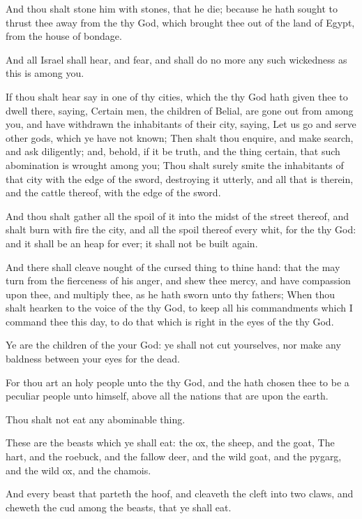 \Verse And thou shalt stone him with stones, that he die; because he hath sought to thrust thee away from the \LORD thy God, which brought thee out of the land of Egypt, from the house of bondage.

\Verse And all Israel shall hear, and fear, and shall do no more any such wickedness as this is among you.

\Verse If thou shalt hear say in one of thy cities, which the \LORD thy God hath given thee to dwell there, saying, \Verse Certain men, the children of Belial, are gone out from among you, and have withdrawn the inhabitants of their city, saying, Let us go and serve other gods, which ye have not known; \Verse Then shalt thou enquire, and make search, and ask diligently; and, behold, if it be truth, and the thing certain, that such abomination is wrought among you; \Verse Thou shalt surely smite the inhabitants of that city with the edge of the sword, destroying it utterly, and all that is therein, and the cattle thereof, with the edge of the sword.

\Verse And thou shalt gather all the spoil of it into the midst of the street thereof, and shalt burn with fire the city, and all the spoil thereof every whit, for the \LORD thy God: and it shall be an heap for ever; it shall not be built again.

\Verse And there shall cleave nought of the cursed thing to thine hand: that the \LORD may turn from the fierceness of his anger, and shew thee mercy, and have compassion upon thee, and multiply thee, as he hath sworn unto thy fathers; \Verse When thou shalt hearken to the voice of the \LORD thy God, to keep all his commandments which I command thee this day, to do that which is right in the eyes of the \LORD thy God.


\Chapter
\Verse Ye are the children of the \LORD your God: ye shall not cut yourselves, nor make any baldness between your eyes for the dead.

\Verse For thou art an holy people unto the \LORD thy God, and the \LORD hath chosen thee to be a peculiar people unto himself, above all the nations that are upon the earth.

\Verse Thou shalt not eat any abominable thing.

\Verse These are the beasts which ye shall eat: the ox, the sheep, and the goat, \Verse The hart, and the roebuck, and the fallow deer, and the wild goat, and the pygarg, and the wild ox, and the chamois.

\Verse And every beast that parteth the hoof, and cleaveth the cleft into two claws, and cheweth the cud among the beasts, that ye shall eat.

